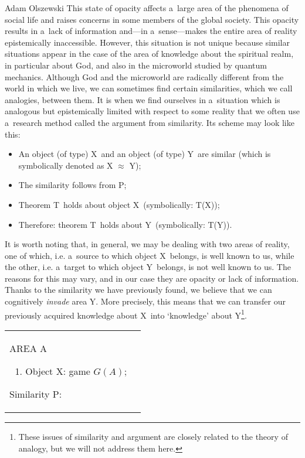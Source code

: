 \begin{artengenv}{Adam Olszewski}
This state of opacity affects a~large area of the phenomena of social life and raises concerns in some members of the global society. This opacity results in a~lack of information and---in a~sense---makes the entire area of reality epistemically inaccessible. However, this situation is not unique because similar situations appear in the case of the area of knowledge about the spiritual realm, in particular about God, and also in the microworld studied by quantum mechanics. Although God and the microworld are radically different from the world in which we live, we can sometimes find certain similarities, which we call analogies, between them. It is when we find ourselves in a~situation which is analogous but epistemically limited with respect to some reality that we often use a~research method called the argument from similarity. Its scheme may look like this:
\begin{itemize}
\item An object (of type) X~and an object (of type) Y~are similar (which is symbolically denoted as X $\approx$ Y);
\item The similarity follows from P;
\item Theorem T~holds about object X~(symbolically: T(X));
\item Therefore: theorem T~holds about Y~(symbolically: T(Y)).
\end{itemize}
It is worth noting that, in general, we may be dealing with two areas of reality, one of which, i.e. a~source to which object X~belongs, is well known to us, while the other, i.e. a~target to which object Y~belongs, is not well known to us. The reasons for this may vary, and in our case they are opacity or lack of information. Thanks to the similarity we have previously found, we believe that we can cognitively \textit{invade} area Y. More precisely, this means that we can transfer our previously acquired knowledge about X~into ‘knowledge' about Y\footnote{These issues of similarity and argument are closely related to the theory of analogy, but we will not address them here.}.





\begin{table}[H]
\begin{small}
\begin{tabular}{|p{}|p{}|}%
\hline%
AREA A

\begin{enumerate}[wide, labelwidth=!, labelindent=0pt]
\item Object X: game $G(A)$;
\end{enumerate}
Similarity P:


\end{tabular}
\end{small}
\end{table}
\end{artengenv}
